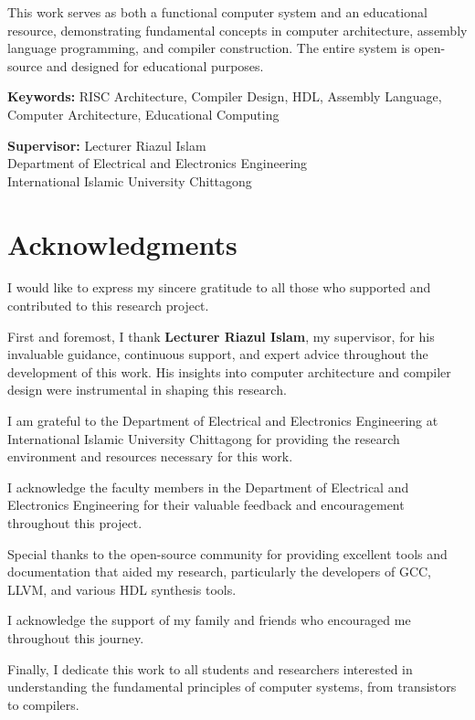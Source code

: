 \documentclass[12pt,a4paper,oneside]{book}
\begin{document}
This work serves as both a functional computer system and an educational resource, demonstrating fundamental concepts in computer architecture, assembly language programming, and compiler construction. The entire system is open-source and designed for educational purposes.

\textbf{Keywords:} RISC Architecture, Compiler Design, HDL, Assembly Language, Computer Architecture, Educational Computing

\vspace{1cm}

\noindent
\textbf{Supervisor:} Lecturer Riazul Islam\\
Department of Electrical and Electronics Engineering\\
International Islamic University Chittagong

\chapter*{Acknowledgments}

I would like to express my sincere gratitude to all those who supported and contributed to this research project.

First and foremost, I thank \textbf{Lecturer Riazul Islam}, my supervisor, for his invaluable guidance, continuous support, and expert advice throughout the development of this work. His insights into computer architecture and compiler design were instrumental in shaping this research.

I am grateful to the Department of Electrical and Electronics Engineering at International Islamic University Chittagong for providing the research environment and resources necessary for this work.

I acknowledge the faculty members in the Department of Electrical and Electronics Engineering for their valuable feedback and encouragement throughout this project.

Special thanks to the open-source community for providing excellent tools and documentation that aided my research, particularly the developers of GCC, LLVM, and various HDL synthesis tools.

I acknowledge the support of my family and friends who encouraged me throughout this journey.

Finally, I dedicate this work to all students and researchers interested in understanding the fundamental principles of computer systems, from transistors to compilers.
\end{document}
